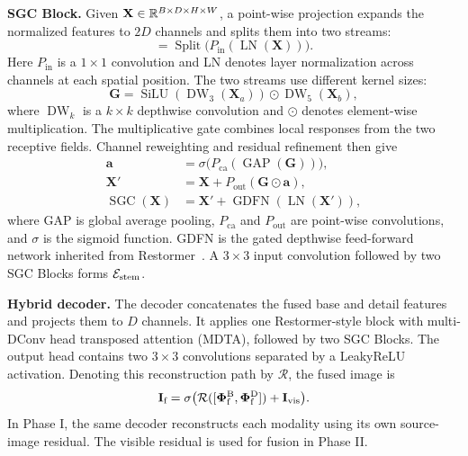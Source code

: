 \textbf{SGC Block.}
Given $\mathbf X\in\mathbb{R}^{B\times D\times H\times W}$, a point-wise projection expands the normalized features to $2D$ channels and splits them into two streams:
\begin{equation}
 [\mathbf X_a,\mathbf X_b]=\operatorname{Split}
 \big(P_{\mathrm{in}}(\operatorname{LN}(\mathbf X))\big).
\end{equation}
Here $P_{\mathrm{in}}$ is a $1\times1$ convolution and LN denotes layer normalization across channels at each spatial position. The two streams use different kernel sizes:
\begin{equation}
 \mathbf G=\operatorname{SiLU}(\operatorname{DW}_{3}(\mathbf X_a))
              \odot\operatorname{DW}_{5}(\mathbf X_b),
\end{equation}
where $\operatorname{DW}_k$ is a $k\times k$ depthwise convolution and $\odot$ denotes element-wise multiplication. The multiplicative gate combines local responses from the two receptive fields. Channel reweighting and residual refinement then give
\begin{equation}
\begin{aligned}
 \mathbf a&=\sigma\big(P_{\mathrm{ca}}(\operatorname{GAP}(\mathbf G))\big),\\
 \mathbf X'&=\mathbf X+P_{\mathrm{out}}(\mathbf G\odot\mathbf a),\\
 \operatorname{SGC}(\mathbf X)&=\mathbf X'+\operatorname{GDFN}(\operatorname{LN}(\mathbf X')),
\end{aligned}
\end{equation}
where GAP is global average pooling, $P_{\mathrm{ca}}$ and $P_{\mathrm{out}}$ are point-wise convolutions, and $\sigma$ is the sigmoid function. GDFN is the gated depthwise feed-forward network inherited from Restormer~\cite{zamir2022restormer}. A $3\times3$ input convolution followed by two SGC Blocks forms $\mathcal{E}_{\text{stem}}$.

\textbf{Hybrid decoder.}
The decoder concatenates the fused base and detail features and projects them to $D$ channels. It applies one Restormer-style block with multi-DConv head transposed attention (MDTA), followed by two SGC Blocks. The output head contains two $3\times3$ convolutions separated by a LeakyReLU activation. Denoting this reconstruction path by $\mathcal R$, the fused image is
\begin{equation}
 \mathbf{I}_{\text{f}}=\sigma\big(\mathcal R([\bm{\Phi}^{\text{B}}_{\mathrm f},\bm{\Phi}^{\text{D}}_{\mathrm f}])+\mathbf{I}_{\text{vis}}\big).
\end{equation}
In Phase I, the same decoder reconstructs each modality using its own source-image residual. The visible residual is used for fusion in Phase II.

